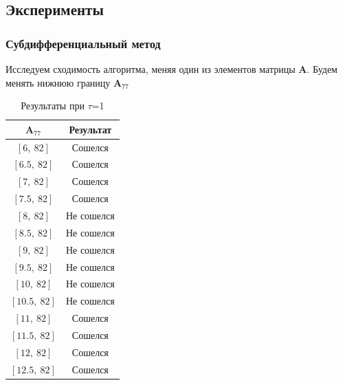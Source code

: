 \documentclass{article}
\begin{document}
    \subsection{Эксперименты}
    \subsubsection{Субдифференциальный метод}
        Исследуем сходимость алгоритма, меняя один из элементов матрицы $\textbf{A}$. Будем менять нижнюю границу $\textbf{A}_{77}$
    \begin{table}[H]
			\centering
			\begin{tabular}{|c|c|}
				\hline
				$\textbf{A}_{77}$ & Результат\\
				
				\hline
				$[6, \ 82]$ & Сошелся \\
				
				\hline
				$[6.5, \ 82]$ & Сошелся \\
				
				\hline
				$[7, \ 82]$ & Сошелся \\
				
				\hline
				$[7.5, \ 82]$ & Сошелся \\
				
				\hline
				$[8, \ 82]$ & Не сошелся \\
				
				\hline
				$[8.5, \ 82]$ & Не сошелся \\
				
				\hline
				$[9, \ 82]$ & Не сошелся \\
				
				\hline
				$[9.5, \ 82]$ & Не сошелся \\
				
				\hline
				$[10, \ 82]$ & Не сошелся \\
				
				\hline
				$[10.5, \ 82]$ & Не сошелся \\
				
				\hline
				$[11, \ 82]$ & Сошелся \\
				
				\hline
				$[11.5, \ 82]$ & Сошелся \\
				
				\hline
				$[12, \ 82]$ & Сошелся \\
				
				\hline
				$[12.5, \ 82]$ & Сошелся \\

				\hline
				
			\end{tabular}
			\caption{Результаты при $\tau$=1}
		\end{table}
    
\end{document}
